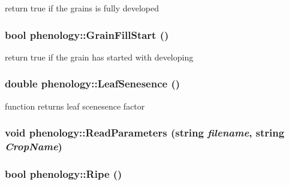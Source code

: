 return true if the grains is fully developed \hypertarget{classphenology_a8cae850ebecaff9242a27d529ab72e09}{
\subsubsection[{GrainFillStart}]{\setlength{\rightskip}{0pt plus 5cm}bool phenology::GrainFillStart ()}}
\label{classphenology_a8cae850ebecaff9242a27d529ab72e09}


return true if the grain has started with developing \hypertarget{classphenology_ad15943ccbe565731b9ddb338ca6384bf}{
\subsubsection[{LeafSenesence}]{\setlength{\rightskip}{0pt plus 5cm}double phenology::LeafSenesence ()}}
\label{classphenology_ad15943ccbe565731b9ddb338ca6384bf}
function returns leaf scenesence factor \hypertarget{classphenology_ac81575bc5131dfe69ed0a2f98b6b723e}{
\subsubsection[{ReadParameters}]{\setlength{\rightskip}{0pt plus 5cm}void phenology::ReadParameters (string {\em filename}, \/  string {\em CropName})}}
\label{classphenology_ac81575bc5131dfe69ed0a2f98b6b723e}
\hypertarget{classphenology_a906583e45eeda4d8a6e1cec487a272cc}{
\subsubsection[{Ripe}]{\setlength{\rightskip}{0pt plus 5cm}bool phenology::Ripe ()}}
\label{classphenology_a906583e45eeda4d8a6e1cec487a272cc}


